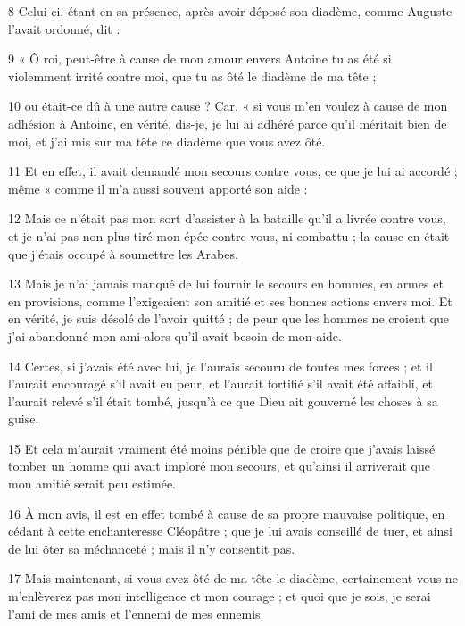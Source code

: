 \par 8 Celui-ci, étant en sa présence, après avoir déposé son diadème, comme Auguste l'avait ordonné, dit :

\par 9 « Ô roi, peut-être à cause de mon amour envers Antoine tu as été si violemment irrité contre moi, que tu as ôté le diadème de ma tête ;

\par 10 ou était-ce dû à une autre cause ? Car, « si vous m'en voulez à cause de mon adhésion à Antoine, en vérité, dis-je, je lui ai adhéré parce qu'il méritait bien de moi, et j'ai mis sur ma tête ce diadème que vous avez ôté.

\par 11 Et en effet, il avait demandé mon secours contre vous, ce que je lui ai accordé ; même « comme il m'a aussi souvent apporté son aide :

\par 12 Mais ce n'était pas mon sort d'assister à la bataille qu'il a livrée contre vous, et je n'ai pas non plus tiré mon épée contre vous, ni combattu ; la cause en était que j'étais occupé à soumettre les Arabes.

\par 13 Mais je n'ai jamais manqué de lui fournir le secours en hommes, en armes et en provisions, comme l'exigeaient son amitié et ses bonnes actions envers moi. Et en vérité, je suis désolé de l'avoir quitté ; de peur que les hommes ne croient que j’ai abandonné mon ami alors qu’il avait besoin de mon aide.

\par 14 Certes, si j'avais été avec lui, je l'aurais secouru de toutes mes forces ; et il l'aurait encouragé s'il avait eu peur, et l'aurait fortifié s'il avait été affaibli, et l'aurait relevé s'il était tombé, jusqu'à ce que Dieu ait gouverné les choses à sa guise.

\par 15 Et cela m'aurait vraiment été moins pénible que de croire que j'avais laissé tomber un homme qui avait imploré mon secours, et qu'ainsi il arriverait que mon amitié serait peu estimée.

\par 16 À mon avis, il est en effet tombé à cause de sa propre mauvaise politique, en cédant à cette enchanteresse Cléopâtre ; que je lui avais conseillé de tuer, et ainsi de lui ôter sa méchanceté ; mais il n'y consentit pas.

\par 17 Mais maintenant, si vous avez ôté de ma tête le diadème, certainement vous ne m'enlèverez pas mon intelligence et mon courage ; et quoi que je sois, je serai l’ami de mes amis et l’ennemi de mes ennemis.

